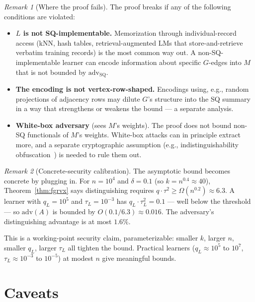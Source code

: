 \documentclass[11pt,a4paper]{article}
\theoremstyle{definition}
\theoremstyle{remark}
\newtheorem*{remark}{Remark}
\newcommand{\Adv}{\mathrm{adv}}
\newcommand{\AdvSQ}{\Adv_{\mathrm{SQ}}}
\begin{document}
\begin{remark}[Where the proof fails]
The proof breaks if any of the following conditions are violated:
\begin{itemize}
  \item \textbf{$L$ is not SQ-implementable.} Memorization through individual-record access (kNN, hash tables, retrieval-augmented LMs that store-and-retrieve verbatim training records) is the most common way out. A non-SQ-implementable learner can encode information about specific $G$-edges into $M$ that is not bounded by $\AdvSQ$.
  \item \textbf{The encoding is not vertex-row-shaped.} Encodings using, e.g., random projections of adjacency rows may dilute $G$'s structure into the SQ summary in a way that strengthens or weakens the bound --- a separate analysis.
  \item \textbf{White-box adversary} (sees $M$'s weights). The proof does not bound non-SQ functionals of $M$'s weights. White-box attacks can in principle extract more, and a separate cryptographic assumption (e.g., indistinguishability obfuscation~\cite{CHLX25}) is needed to rule them out.
\end{itemize}
\end{remark}

\begin{remark}[Concrete-security calibration]
The asymptotic bound becomes concrete by plugging in. For $n = 10^4$ and $\delta = 0.1$ (so $k = n^{0.4} \approx 40$), Theorem~\ref{thm:fgrvx} says distinguishing requires $q \cdot \tau^2 \ge \Omega(n^{0.2}) \approx 6.3$. A learner with $q_L = 10^5$ and $\tau_L = 10^{-3}$ has $q_L \cdot \tau_L^2 = 0.1$ --- well below the threshold --- so $\Adv(A)$ is bounded by $O(0.1 / 6.3) \approx 0.016$. The adversary's distinguishing advantage is at most $1.6\%$.

This is a working-point security claim, parameterizable: smaller $k$, larger $n$, smaller $q_L$, larger $\tau_L$ all tighten the bound. Practical learners ($q_L \approx 10^5$ to $10^7$, $\tau_L \approx 10^{-3}$ to $10^{-5}$) at modest $n$ give meaningful bounds.
\end{remark}

\section{Caveats}
\end{document}
